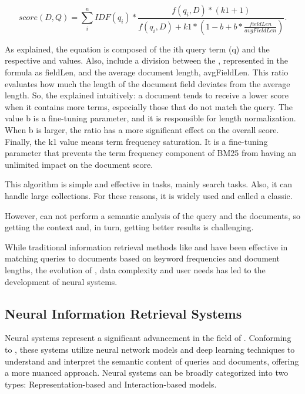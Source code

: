 \begin{equation}
score(D,Q) = \sum_{i}^{n} IDF(q_{i}) \ast \frac{f(q_{i},D) \ast (k1 + 1)}{f(q_{i},D) + k1 \ast (1 - b + b \ast \frac{fieldLen}{avgFieldLen})}.
\label{eqn:bm25}
\end{equation}

As \citet{phd_understanding_2023} explained, the {\bm} equation is composed of the ith query term (q) and the respective {\idf} and {\tf} values. Also, include a division between the {\dl}, represented in the formula as fieldLen, and the average document length, avgFieldLen. This ratio evaluates how much the length of the document field deviates from the average length. So, the \citet{noauthor_practical_2018} explained intuitively: a document tends to receive a lower score when it contains more terms, especially those that do not match the query. The value b is a fine-tuning parameter, and it is responsible for length normalization. When b is larger, the ratio has a more significant effect on the overall score. Finally, the k1 value means term frequency saturation. It is a fine-tuning parameter that prevents the term frequency component of BM25 from having an unlimited impact on the document score.

This algorithm is simple and effective in {\ir} tasks, mainly search tasks. Also, it can handle large collections. For these reasons, it is widely used and called a classic.

However, {\bm} can not perform a semantic analysis of the query and the documents, so getting the context and, in turn, getting better results is challenging. 



While traditional information retrieval methods like {\tfidf} and {\bm} have been effective in matching queries to documents based on keyword frequencies and document lengths, the evolution of {\ai}, data complexity and user needs has led to the development of neural {\ir} systems.



\subsection{Neural Information Retrieval Systems}

Neural {\ir} systems represent a significant advancement in the field of {\ir}. Conforming to \citet{mitra_introduction_nodate}, these systems utilize neural network models and deep learning techniques to understand and interpret the semantic content of queries and documents, offering a more nuanced approach. Neural {\ir} systems can be broadly categorized into two types: Representation-based and Interaction-based models.

